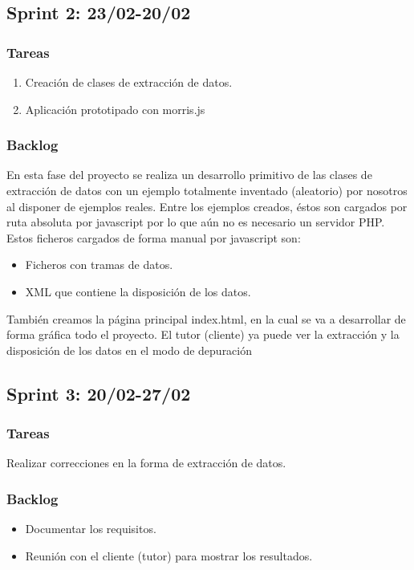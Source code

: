  

\subsection{Sprint 2: 23/02-20/02}
\subsubsection{Tareas}
\begin{enumerate}
	\item Creación de clases de extracción de datos.
	\item Aplicación prototipado con morris.js
\end{enumerate}
 
\subsubsection{Backlog}

En esta fase del proyecto se realiza un desarrollo primitivo de las clases de extracción de datos con un ejemplo totalmente inventado (aleatorio) por nosotros al disponer de ejemplos reales. Entre los ejemplos creados, éstos son cargados por ruta absoluta por javascript por lo que aún no es necesario un servidor PHP. 
Estos ficheros cargados de forma manual por javascript son:
\begin{itemize}
	\item Ficheros con tramas de datos.
	\item XML que contiene la disposición de los datos.
\end{itemize}

También creamos la página principal index.html, en la cual se va a desarrollar de forma gráfica todo el proyecto.
El tutor (cliente) ya puede ver la extracción y la disposición de los datos en el modo de depuración 

\subsection{Sprint 3: 20/02-27/02}
\subsubsection{Tareas}
Realizar correcciones en la forma de extracción de datos.
\subsubsection{Backlog}
\begin{itemize}
	\item Documentar los requisitos.
	\item Reunión con el cliente (tutor) para mostrar los resultados.

\end{itemize}

